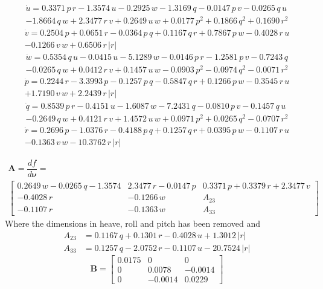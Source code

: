 \documentclass[12pt,a4]{article}
\begin{document}
\begin{multline}
	\dot{u} = 0.3371\,p\,r-1.3574\,u-0.2925\,w-1.3169\,q-0.0147\,p\,v-0.0265\,q\,u \\
	-1.8664\,q\,w+2.3477\,r\,v+0.2649\,u\,w+0.0177\,p^2+0.1866\,q^2+0.1690\,r^2
\end{multline}
\begin{multline}
	\dot{v} = 0.2504\,p+0.0651\,r-0.0364\,p\,q+0.1167\,q\,r+0.7867\,p\,w-0.4028\,r\,u \\
	-0.1266\,v\,w+0.6506\,r\,\left|r\right|
\end{multline}
\begin{multline}
	\dot{w} = 0.5354\,q\,u-0.0415\,u-5.1289\,w-0.0146\,p\,r-1.2581\,p\,v-0.7243\,q \\
	-0.0265\,q\,w+0.0412\,r\,v+0.1457\,u\,w-0.0903\,p^2-0.0974\,q^2-0.0071\,r^2
\end{multline}
\begin{multline}
	\dot{p} = 0.2244\,r-3.3993\,p-0.1257\,p\,q-0.5847\,q\,r+0.1266\,p\,w-0.3545\,r\,u \\
	+1.7190\,v\,w+2.2439\,r\,\left|r\right|
\end{multline}
\begin{multline}
	\dot{q} = 0.8539\,p\,r-0.4151\,u-1.6087\,w-7.2431\,q-0.0810\,p\,v-0.1457\,q\,u \\
	-0.2649\,q\,w+0.4121\,r\,v+1.4572\,u\,w+0.0971\,p^2+0.0265\,q^2-0.0707\,r^2
\end{multline}
\begin{multline}
	\dot{r} = 0.2696\,p-1.0376\,r-0.4188\,p\,q+0.1257\,q\,r+0.0395\,p\,w-0.1107\,r\,u \\
	-0.1363\,v\,w-10.3762\,r\,\left|r\right|
\end{multline}


\begin{multline}
	\bm{A} = \dfrac{df}{d\bm{\nu}}=	\\
	\left[\begin{array}{ccc}
			0.2649\,w-0.0265\,q-1.3574 & 2.3477\,r-0.0147\,p & 0.3371\,p+0.3379\,r+2.3477\,v \\
			-0.4028\,r                 & -0.1266\,w          & A_{23}                        \\
			-0.1107\,r                 & -0.1363\,w          & A_{33}
		\end{array}\right]
\end{multline}
Where the dimensions in heave, roll and pitch has been removed and
\begin{align}
	A_{23} & = 0.1167\,q+0.1301\,r-0.4028\,u	+1.3012\,\left|r\right|  \\
	A_{33} & = 0.1257\,q-2.0752\,r-0.1107\,u	-20.7524\,\left|r\right|
\end{align}
\begin{equation}
	\bm{B} = \left[\begin{array}{ccc} 0.0175 & 0 & 0\\ 0 & 0.0078 & -0.0014\\ 0 & -0.0014 & 0.0229 \end{array}\right]
\end{equation}
\end{document}
